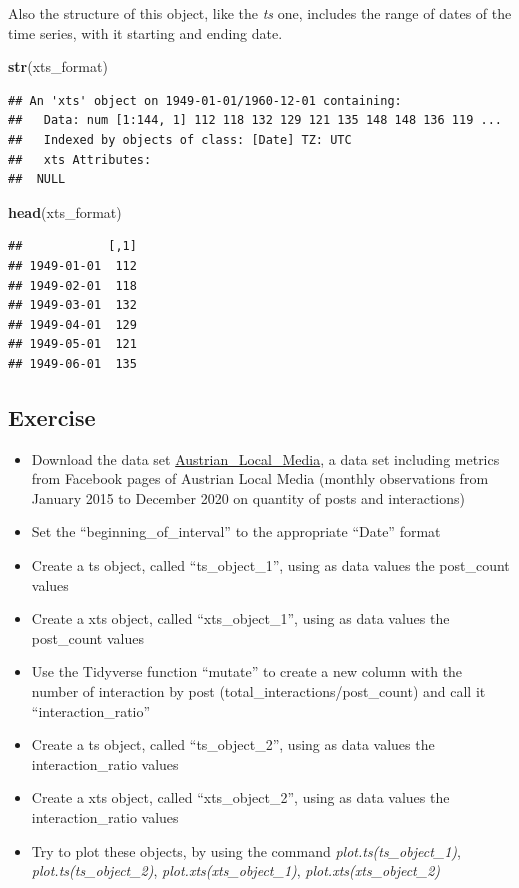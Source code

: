 \documentclass[
]{article}
\newenvironment{Shaded}{\begin{snugshade}}{\end{snugshade}}
\newcommand{\KeywordTok}[1]{\textcolor[rgb]{0.13,0.29,0.53}{\textbf{#1}}}
\newcommand{\NormalTok}[1]{#1}
\providecommand{\tightlist}{%
  \setlength{\itemsep}{0pt}\setlength{\parskip}{0pt}}
\begin{document}
Also the structure of this object, like the \emph{ts} one, includes the range of dates of the time series, with it starting and ending date.

\begin{Shaded}
\begin{Highlighting}[]
\KeywordTok{str}\NormalTok{(xts_format)}
\end{Highlighting}
\end{Shaded}

\begin{verbatim}
## An 'xts' object on 1949-01-01/1960-12-01 containing:
##   Data: num [1:144, 1] 112 118 132 129 121 135 148 148 136 119 ...
##   Indexed by objects of class: [Date] TZ: UTC
##   xts Attributes:  
##  NULL
\end{verbatim}

\begin{Shaded}
\begin{Highlighting}[]
\KeywordTok{head}\NormalTok{(xts_format)}
\end{Highlighting}
\end{Shaded}

\begin{verbatim}
##            [,1]
## 1949-01-01  112
## 1949-02-01  118
## 1949-03-01  132
## 1949-04-01  129
## 1949-05-01  121
## 1949-06-01  135
\end{verbatim}

\hypertarget{exercise-1}{%
\subsection{Exercise}\label{exercise-1}}

\begin{itemize}
\tightlist
\item
  Download the data set \href{https://drive.google.com/file/d/1RKPFOLsIAPLuACcrcB0iiq289CvDDgiT/view?usp=sharing}{Austrian\_Local\_Media}, a data set including metrics from Facebook pages of Austrian Local Media (monthly observations from January 2015 to December 2020 on quantity of posts and interactions)
\item
  Set the ``beginning\_of\_interval'' to the appropriate ``Date'' format
\item
  Create a ts object, called ``ts\_object\_1'', using as data values the post\_count values
\item
  Create a xts object, called ``xts\_object\_1'', using as data values the post\_count values
\item
  Use the Tidyverse function ``mutate'' to create a new column with the number of interaction by post (total\_interactions/post\_count) and call it ``interaction\_ratio''
\item
  Create a ts object, called ``ts\_object\_2'', using as data values the interaction\_ratio values
\item
  Create a xts object, called ``xts\_object\_2'', using as data values the interaction\_ratio values
\item
  Try to plot these objects, by using the command \emph{plot.ts(ts\_object\_1)}, \emph{plot.ts(ts\_object\_2)}, \emph{plot.xts(xts\_object\_1)}, \emph{plot.xts(xts\_object\_2)}
\end{itemize}
\end{document}

